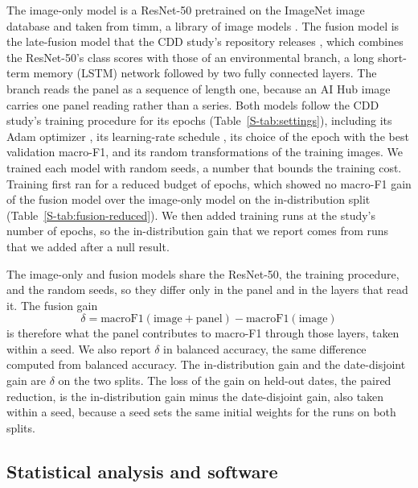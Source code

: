 \documentclass[preprint,12pt,authoryear,nopreprintline]{elsarticle}
\begin{document}
The image-only model is a ResNet-50 \citep{he2016deep} pretrained on the ImageNet
image database \citep{deng2009imagenet} and taken from timm, a library of image
models \citep{wightman2019timm}. The fusion model is the late-fusion model that the
CDD study's repository releases \citep{cropdiseaserepo}, which combines the
ResNet-50's class scores with those of an environmental branch, a long short-term
memory (LSTM) network \citep{hochreiter1997lstm} followed by two fully connected
layers. The branch reads the panel as a sequence of length one, because an AI Hub
image carries one panel reading rather than a series. Both models follow the CDD
study's training procedure for its \matchedEpochs{} epochs (Table~\ref{S-tab:settings}), including its Adam optimizer \citep{kingma2015adam}, its learning-rate schedule \citep{loshchilov2017sgdr}, its choice of the epoch with
the best validation macro-F1, and its random transformations of the training images.
We trained each model with \fusionSeeds{} random seeds,
a number that bounds the training cost. Training first ran for a reduced budget of
\lowBudgetEpochs{} epochs, which showed no macro-F1 gain of the fusion model over the
image-only model on the in-distribution split (Table~\ref{S-tab:fusion-reduced}). We
then added training runs at the study's number of epochs, so the in-distribution gain
that we report comes from runs that we added after a null result.

The image-only and fusion models share the ResNet-50, the training procedure, and the
random seeds, so
they differ only in the panel and in the layers that read it. The fusion gain
\begin{equation}
\delta = \mathrm{macroF1}(\text{image}+\text{panel}) - \mathrm{macroF1}(\text{image})
\label{eq:gain}
\end{equation}
is therefore what the panel contributes to macro-F1 through those layers, taken
within a seed. We also report $\delta$ in balanced accuracy, the same difference computed
from balanced accuracy. The in-distribution gain and the date-disjoint gain are $\delta$ on the
two splits. The loss of the gain on held-out dates, the paired reduction, is the
in-distribution gain minus the date-disjoint gain, also taken within a seed, because a
seed sets the same initial weights for the runs on both splits.

\subsection{Statistical analysis and software}
\label{sec:stats}
\end{document}
